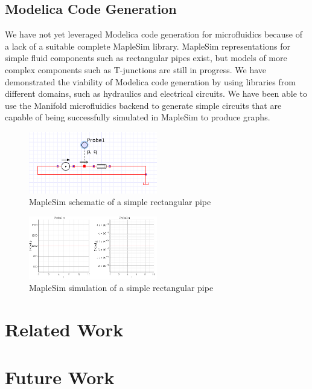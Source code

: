 \subsection{Modelica Code Generation}

We have not yet leveraged Modelica code generation for microfluidics because of a lack of a suitable complete MapleSim library.
MapleSim representations for simple fluid components such as rectangular pipes exist, but models of more complex components such as T-junctions are still in progress.
We have demonstrated the viability of Modelica code generation by using libraries from different domains, such as hydraulics and electrical circuits.
We have been able to use the Manifold microfluidics backend to generate simple circuits that are capable of being successfully simulated in MapleSim to produce graphs.

\begin{figure}[ht]
  \caption{MapleSim schematic of a simple rectangular pipe}
  \centering
    \includegraphics[width=0.5\textwidth]{img/simple-pipe.png}
\end{figure}
\begin{figure}[ht]
  \caption{MapleSim simulation of a simple rectangular pipe}
  \centering
    \includegraphics[width=0.5\textwidth]{img/simple-pipe-simulation.png}
\end{figure}

\section{Related Work}



\section{Future Work}

